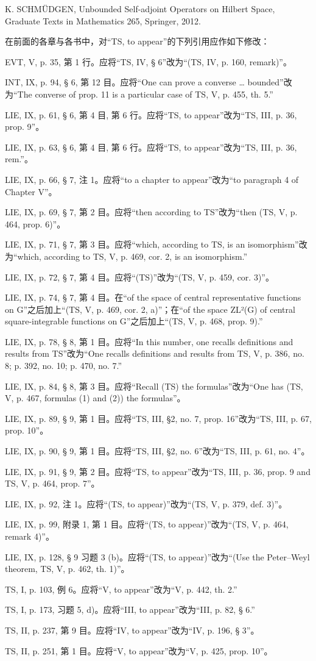 K. SCHMÜDGEN, Unbounded Self-adjoint Operators on Hilbert Space, Graduate Texts in Mathematics 265, Springer, 2012.

在前面的各章与各书中，对“TS, to appear”的下列引用应作如下修改：

EVT, V, p. 35, 第 1 行。应将“TS, IV, § 6”改为“(TS, IV, p. 160, remark)”。

INT, IX, p. 94, § 6, 第 12 目。应将“One can prove a converse \ldots{} bounded”改为“The converse of prop. 11 is a particular case of TS, V, p. 455, th. 5.”

LIE, IX, p. 61, § 6, 第 4 目, 第 6 行。应将“TS, to appear”改为“TS, III, p. 36, prop. 9”。

LIE, IX, p. 63, § 6, 第 4 目, 第 6 行。应将“TS, to appear”改为“TS, III, p. 36, rem.”。

LIE, IX, p. 66, § 7, 注 1。应将“to a chapter to appear”改为“to paragraph 4 of Chapter V”。

LIE, IX, p. 69, § 7, 第 2 目。应将“then according to TS”改为“then (TS, V, p. 464, prop. 6)”。

LIE, IX, p. 71, § 7, 第 3 目。应将“which, according to TS, is an isomorphism”改为“which, according to TS, V, p. 469, cor. 2, is an isomorphism.”

LIE, IX, p. 72, § 7, 第 4 目。应将“(TS)”改为“(TS, V, p. 459, cor. 3)”。

LIE, IX, p. 74, § 7, 第 4 目。在“of the space of central representative functions on G”之后加上“(TS, V, p. 469, cor. 2, a)”；在“of the space ZL²(G) of central square-integrable functions on G”之后加上“(TS, V, p. 468, prop. 9).”

LIE, IX, p. 78, § 8, 第 1 目。应将“In this number, one recalls definitions and results from TS”改为“One recalls definitions and results from TS, V, p. 386, no. 8; p. 392, no. 10; p. 470, no. 7.”

LIE, IX, p. 84, § 8, 第 3 目。应将“Recall (TS) the formulas”改为“One has (TS, V, p. 467, formulas (1) and (2)) the formulas”。

LIE, IX, p. 89, § 9, 第 1 目。应将“TS, III, §2, no. 7, prop. 16”改为“TS, III, p. 67, prop. 10”。

LIE, IX, p. 90, § 9, 第 1 目。应将“TS, III, §2, no. 6”改为“TS, III, p. 61, no. 4”。

LIE, IX, p. 91, § 9, 第 2 目。应将“TS, to appear”改为“TS, III, p. 36, prop. 9 and TS, V, p. 464, prop. 7”。

LIE, IX, p. 92, 注 1。应将“(TS, to appear)”改为“(TS, V, p. 379, def. 3)”。

LIE, IX, p. 99, 附录 1, 第 1 目。应将“(TS, to appear)”改为“(TS, V, p. 464, remark 4)”。

LIE, IX, p. 128, § 9 习题 3 (b)。应将“(TS, to appear)”改为“(Use the Peter--Weyl theorem, TS, V, p. 462, th. 1)”。

TS, I, p. 103, 例 6。应将“V, to appear”改为“V, p. 442, th. 2.”

TS, I, p. 173, 习题 5, d)。应将“III, to appear”改为“III, p. 82, § 6.”

TS, II, p. 237, 第 9 目。应将“IV, to appear”改为“IV, p. 196, § 3”。

TS, II, p. 251, 第 1 目。应将“V, to appear”改为“V, p. 425, prop. 10”。

